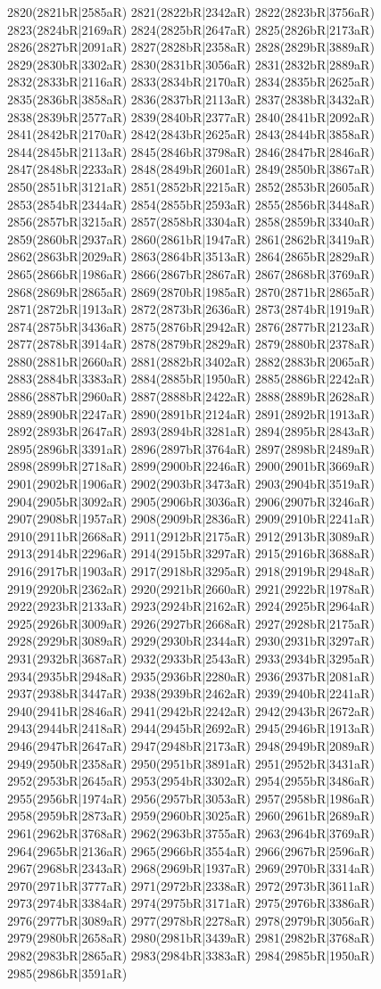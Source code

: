 2820(2821bR|2585aR) 2821(2822bR|2342aR) 2822(2823bR|3756aR) 2823(2824bR|2169aR) 2824(2825bR|2647aR) 2825(2826bR|2173aR) 2826(2827bR|2091aR) 2827(2828bR|2358aR) 2828(2829bR|3889aR) 2829(2830bR|3302aR) 2830(2831bR|3056aR) 2831(2832bR|2889aR) 2832(2833bR|2116aR) 2833(2834bR|2170aR) 2834(2835bR|2625aR) 2835(2836bR|3858aR) 2836(2837bR|2113aR) 2837(2838bR|3432aR) 2838(2839bR|2577aR) 2839(2840bR|2377aR) 2840(2841bR|2092aR) 2841(2842bR|2170aR) 2842(2843bR|2625aR) 2843(2844bR|3858aR) 2844(2845bR|2113aR) 2845(2846bR|3798aR) 2846(2847bR|2846aR) 2847(2848bR|2233aR) 2848(2849bR|2601aR) 2849(2850bR|3867aR) 2850(2851bR|3121aR) 2851(2852bR|2215aR) 2852(2853bR|2605aR) 2853(2854bR|2344aR) 2854(2855bR|2593aR) 2855(2856bR|3448aR) 2856(2857bR|3215aR) 2857(2858bR|3304aR) 2858(2859bR|3340aR) 2859(2860bR|2937aR) 2860(2861bR|1947aR) 2861(2862bR|3419aR) 2862(2863bR|2029aR) 2863(2864bR|3513aR) 2864(2865bR|2829aR) 2865(2866bR|1986aR) 2866(2867bR|2867aR) 2867(2868bR|3769aR) 2868(2869bR|2865aR) 2869(2870bR|1985aR) 2870(2871bR|2865aR) 2871(2872bR|1913aR) 2872(2873bR|2636aR) 2873(2874bR|1919aR) 2874(2875bR|3436aR) 2875(2876bR|2942aR) 2876(2877bR|2123aR) 2877(2878bR|3914aR) 2878(2879bR|2829aR) 2879(2880bR|2378aR) 2880(2881bR|2660aR) 2881(2882bR|3402aR) 2882(2883bR|2065aR) 2883(2884bR|3383aR) 2884(2885bR|1950aR) 2885(2886bR|2242aR) 2886(2887bR|2960aR) 2887(2888bR|2422aR) 2888(2889bR|2628aR) 2889(2890bR|2247aR) 2890(2891bR|2124aR) 2891(2892bR|1913aR) 2892(2893bR|2647aR) 2893(2894bR|3281aR) 2894(2895bR|2843aR) 2895(2896bR|3391aR) 2896(2897bR|3764aR) 2897(2898bR|2489aR) 2898(2899bR|2718aR) 2899(2900bR|2246aR) 2900(2901bR|3669aR) 2901(2902bR|1906aR) 2902(2903bR|3473aR) 2903(2904bR|3519aR) 2904(2905bR|3092aR) 2905(2906bR|3036aR) 2906(2907bR|3246aR) 2907(2908bR|1957aR) 2908(2909bR|2836aR) 2909(2910bR|2241aR) 2910(2911bR|2668aR) 2911(2912bR|2175aR) 2912(2913bR|3089aR) 2913(2914bR|2296aR) 2914(2915bR|3297aR) 2915(2916bR|3688aR) 2916(2917bR|1903aR) 2917(2918bR|3295aR) 2918(2919bR|2948aR) 2919(2920bR|2362aR) 2920(2921bR|2660aR) 2921(2922bR|1978aR) 2922(2923bR|2133aR) 2923(2924bR|2162aR) 2924(2925bR|2964aR) 2925(2926bR|3009aR) 2926(2927bR|2668aR) 2927(2928bR|2175aR) 2928(2929bR|3089aR) 2929(2930bR|2344aR) 2930(2931bR|3297aR) 2931(2932bR|3687aR) 2932(2933bR|2543aR) 2933(2934bR|3295aR) 2934(2935bR|2948aR) 2935(2936bR|2280aR) 2936(2937bR|2081aR) 2937(2938bR|3447aR) 2938(2939bR|2462aR) 2939(2940bR|2241aR) 2940(2941bR|2846aR) 2941(2942bR|2242aR) 2942(2943bR|2672aR) 2943(2944bR|2418aR) 2944(2945bR|2692aR) 2945(2946bR|1913aR) 2946(2947bR|2647aR) 2947(2948bR|2173aR) 2948(2949bR|2089aR) 2949(2950bR|2358aR) 2950(2951bR|3891aR) 2951(2952bR|3431aR) 2952(2953bR|2645aR) 2953(2954bR|3302aR) 2954(2955bR|3486aR) 2955(2956bR|1974aR) 2956(2957bR|3053aR) 2957(2958bR|1986aR) 2958(2959bR|2873aR) 2959(2960bR|3025aR) 2960(2961bR|2689aR) 2961(2962bR|3768aR) 2962(2963bR|3755aR) 2963(2964bR|3769aR) 2964(2965bR|2136aR) 2965(2966bR|3554aR) 2966(2967bR|2596aR) 2967(2968bR|2343aR) 2968(2969bR|1937aR) 2969(2970bR|3314aR) 2970(2971bR|3777aR) 2971(2972bR|2338aR) 2972(2973bR|3611aR) 2973(2974bR|3384aR) 2974(2975bR|3171aR) 2975(2976bR|3386aR) 2976(2977bR|3089aR) 2977(2978bR|2278aR) 2978(2979bR|3056aR) 2979(2980bR|2658aR) 2980(2981bR|3439aR) 2981(2982bR|3768aR) 2982(2983bR|2865aR) 2983(2984bR|3383aR) 2984(2985bR|1950aR) 2985(2986bR|3591aR) 